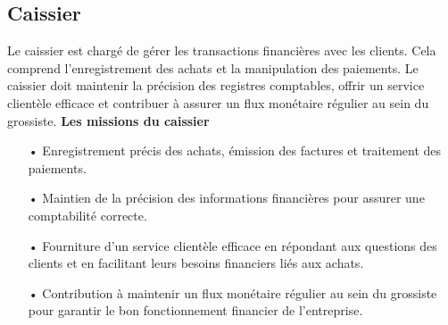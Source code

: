\documentclass[edit,12pt,a4paper,ChapStyle,oneside,doubleinterligne]{report}
\begin{document}
\subsection{Caissier}
Le caissier est chargé de gérer les transactions financières avec les clients. Cela comprend l'enregistrement des achats et la manipulation des paiements. Le caissier doit maintenir la précision des registres comptables, offrir un service clientèle efficace et contribuer à assurer un flux monétaire régulier au sein du grossiste\cite{Personnel}.
\newline\newline\textbf{Les missions du caissier}\newline
\begin{itemize}
    \item [•] Enregistrement précis des achats, émission des factures et traitement des paiements.
    \item [•] Maintien de la précision des informations financières pour assurer une comptabilité correcte.
    \item [•] Fourniture d'un service clientèle efficace en répondant aux questions des clients et en facilitant leurs besoins financiers liés aux achats.
    \item [•] Contribution à maintenir un flux monétaire régulier au sein du grossiste pour garantir le bon fonctionnement financier de l'entreprise.
\end{itemize}
\end{document}
